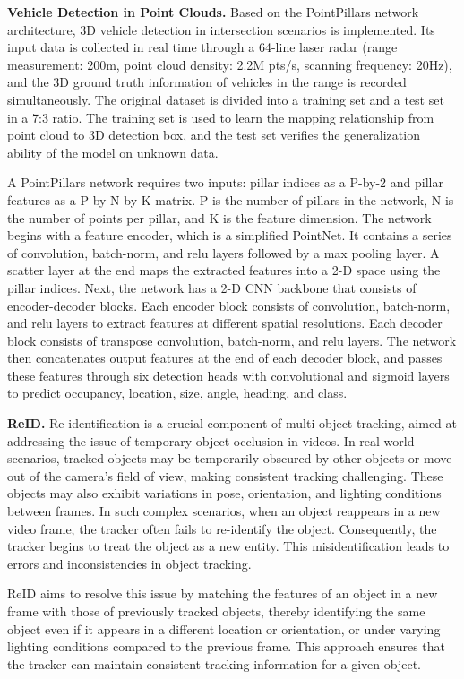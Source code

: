 \documentclass[lettersize,journal]{IEEEtran}
\begin{document}
\textbf{Vehicle Detection in Point Clouds.}
Based on the PointPillars network architecture, 3D vehicle detection in intersection scenarios is implemented. Its input data is collected in real time through a 64-line laser radar (range measurement: 200m, point cloud density: 2.2M pts/s, scanning frequency: 20Hz), and the 3D ground truth information of vehicles in the range is recorded simultaneously. The original dataset is divided into a training set and a test set in a 7:3 ratio. The training set is used to learn the mapping relationship from point cloud to 3D detection box, and the test set verifies the generalization ability of the model on unknown data.

A PointPillars network requires two inputs: pillar indices as a P-by-2 and pillar features as a P-by-N-by-K matrix. P is the number of pillars in the network, N is the number of points per pillar, and K is the feature dimension.
The network begins with a feature encoder, which is a simplified PointNet. It contains a series of convolution, batch-norm, and relu layers followed by a max pooling layer. A scatter layer at the end maps the extracted features into a 2-D space using the pillar indices.
Next, the network has a 2-D CNN backbone that consists of encoder-decoder blocks. Each encoder block consists of convolution, batch-norm, and relu layers to extract features at different spatial resolutions. Each decoder block consists of transpose convolution, batch-norm, and relu layers.
The network then concatenates output features at the end of each decoder block, and passes these features through six detection heads with convolutional and sigmoid layers to predict occupancy, location, size, angle, heading, and class.

\textbf{ReID.}
Re-identification is a crucial component of multi-object tracking, aimed at addressing the issue of temporary object occlusion in videos. 
In real-world scenarios, tracked objects may be temporarily obscured by other objects or move out of the camera's field of view, making consistent tracking challenging. 
These objects may also exhibit variations in pose, orientation, and lighting conditions between frames. 
In such complex scenarios, when an object reappears in a new video frame, the tracker often fails to re-identify the object. 
Consequently, the tracker begins to treat the object as a new entity. 
This misidentification leads to errors and inconsistencies in object tracking.

ReID aims to resolve this issue by matching the features of an object in a new frame with those of previously tracked objects, thereby identifying the same object even if it appears in a different location or orientation, or under varying lighting conditions compared to the previous frame. 
This approach ensures that the tracker can maintain consistent tracking information for a given object\cite{Alpher24d}.
\end{document}
